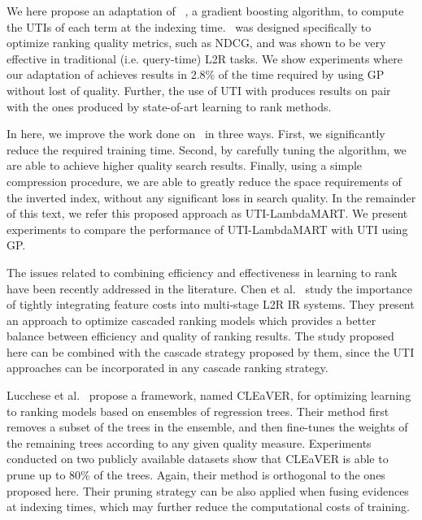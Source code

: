 \documentclass[preprint,review,10pt,3p]{elsarticle}
\begin{document}
We  here propose an adaptation of \lambdamart~\cite{wu2010lambdamart}, a gradient boosting algorithm, to compute the UTIs of each term at the indexing time. \lambdamart\ was designed specifically to optimize ranking quality metrics, such as NDCG, and was shown to be very effective in traditional (i.e. query-time) L2R tasks. We show experiments where  our adaptation of \lambdamart achieves results in 2.8\% of the time required by \lepref using GP without lost of quality. Further, the use of UTI with \lambdamart produces results on pair with the ones produced by state-of-art learning to rank methods.

In here, we improve the work done on \lepref\ in three ways. First, we significantly reduce the required training time. Second, by carefully tuning the algorithm, we are able to achieve higher quality search results. Finally, using a simple compression procedure, we are able to greatly reduce the space requirements of the inverted index, without any significant loss in search quality. In the remainder of this text, we refer this 
proposed approach as UTI-LambdaMART. We present experiments to compare the performance of UTI-LambdaMART with UTI using GP.

The issues related to combining efficiency and effectiveness in learning to rank have been recently addressed in the literature. Chen et al.~\cite{Chen2017} study  the importance of tightly integrating feature costs into multi-stage L2R IR systems. They present an approach to optimize cascaded ranking models  which provides a better balance between efficiency and quality of ranking results.  The study proposed here can be combined with the cascade strategy proposed by them, since the UTI approaches can be  incorporated in any cascade ranking strategy.

Lucchese et al.~\cite{Lucchese2016}  propose a  framework, named CLEaVER, for optimizing  learning to ranking models based on ensembles of regression trees.  Their method first removes a subset of the trees in the ensemble, and then fine-tunes the weights of the remaining trees according to any given quality measure. Experiments conducted on two publicly available  datasets show that CLEaVER is able to prune up to 80\% of the trees. Again, their method is orthogonal to the ones proposed here. Their pruning strategy can be also applied when fusing evidences at indexing times, which may further reduce the computational costs  of training. 


\end{document}

